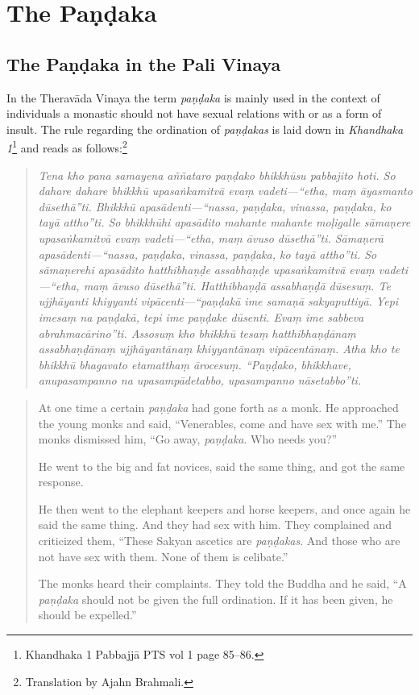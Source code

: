 \section{The Paṇḍaka}

\subsection{The Paṇḍaka in the Pali Vinaya}
In the Theravāda Vinaya the term {\em paṇḍaka} is mainly used in the context of individuals a monastic should not have sexual relations with or as a form of insult. The rule regarding the ordination of {\em paṇḍakas} is laid down in {\em Khandhaka 1}\footnote{Khandhaka 1 Pabbajjā PTS vol 1 page 85–86.} and reads as follows:\footnote{Translation by Ajahn Brahmali.}

\begin{quote}
{\em Tena kho pana samayena aññataro paṇḍako bhikkhūsu pabbajito hoti. So dahare dahare bhikkhū upasaṅkamitvā evaṃ vadeti—“etha, maṃ āyasmanto dūsethā”ti. Bhikkhū apasādenti—“nassa, paṇḍaka, vinassa, paṇḍaka, ko tayā attho”ti. So bhikkhūhi apasādito mahante mahante moḷigalle sāmaṇere upasaṅkamitvā evaṃ vadeti—“etha, maṃ āvuso dūsethā”ti. Sāmaṇerā apasādenti—“nassa, paṇḍaka, vinassa, paṇḍaka, ko tayā attho”ti. So sāmaṇerehi apasādito hatthibhaṇḍe assabhaṇḍe upasaṅkamitvā evaṃ vadeti—“etha, maṃ āvuso dūsethā”ti. Hatthibhaṇḍā assabhaṇḍā dūsesuṃ. Te ujjhāyanti khiyyanti vipācenti—“paṇḍakā ime samaṇā sakyaputtiyā. Yepi imesaṃ na paṇḍakā, tepi ime paṇḍake dūsenti. Evaṃ ime sabbeva abrahmacārino”ti. Assosuṃ kho bhikkhū tesaṃ hatthibhaṇḍānaṃ assabhaṇḍānaṃ ujjhāyantānaṃ khiyyantānaṃ vipācentānaṃ. Atha kho te bhikkhū bhagavato etamatthaṃ ārocesuṃ. “Paṇḍako, bhikkhave, anupasampanno na upasampādetabbo, upasampanno nāsetabbo”ti.}
\end{quote}

\begin{quote}
At one time a certain {\em paṇḍaka} had gone forth as a monk. He approached the young monks and said, “Venerables, come and have sex with me.” The monks dismissed him, “Go away, {\em paṇḍaka}. Who needs you?”

He went to the big and fat novices, said the same thing, and got the same response.

He then went to the elephant keepers and horse keepers, and once again he said the same thing. And they had sex with him. They complained and criticized them, “These Sakyan ascetics are {\em paṇḍakas}. And those who are not have sex with them. None of them is celibate.”

The monks heard their complaints. They told the Buddha and he said, “A {\em paṇḍaka} should not be given the full ordination. If it has been given, he should be expelled.”
\end{quote}

